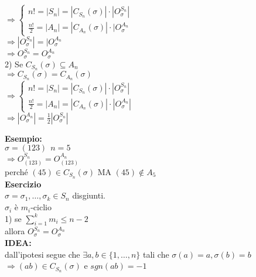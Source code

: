\documentclass[12px]{article}
\begin{document}
{\begin{dimo}
		 $ \Rightarrow \begin{cases}
			 n! = |S_n| = |C_{S_n}(\sigma)|\cdot |O_\sigma^{S_n}|\\
			 \frac{n!}2 = |A_n| = |C_{A_n}(\sigma)|\cdot|O_\sigma^{A_n}
		 \end{cases}$ \\
	 $ \Rightarrow |O_\sigma^{S_n}| = |O_\sigma^{A_n}$\\
	 $ \Rightarrow O_\sigma ^{S_n}= O_\sigma^{A_n}$ \\
	 2) Se $C_{S_n}(\sigma)\subseteq A_n$\\
	 $ \Rightarrow C_{S_n}(\sigma) = C_{A_n}(\sigma)$\\
	 $ \Rightarrow \begin{cases}
		 n! = |S_n| = |C_{S_n}(\sigma)|\cdot|O_\sigma^{S_n}|\\
		 \frac{n!}2 = |A_n| = |C_{A_n}(\sigma)|\cdot|O_\sigma^{A_n}|

	 \end{cases}$ \\
	 $ \Rightarrow |O_\sigma ^{A_n}| = \frac 12 |O_\sigma^{S_n}|$
		
	\end{dimo}
	\textbf{Esempio:}\\
	$\sigma = (123) \ \ n = 5$\\
	$ \Rightarrow O^{S_n}_{(123)} = O^{A_n}_{(123)}$\\
	perché $(45)\in C_{S_n}(\sigma)$ MA $(45)\not\in A_5$\\
	\textbf{Esercizio}\\
	$\sigma = \sigma_1,\ldots, \sigma_k\in S_n$ disgiunti.\\
	$\sigma_i$ è $m_i$-ciclio\\
	1) se $\sum^k_{i=1}m_i\leq n-2$\\
	allora $O_\sigma^{S_n} = O_\sigma^{A_n}$ \\
\textbf{IDEA:}\\
dall'ipotesi segue che $\exists a,b\in\{1,\ldots,n\}$ tali che $\sigma(a) = a, \sigma (b) = b$\\
$ \Rightarrow (ab)\in C_{S_n}(\sigma)$ e $sgn(ab) = -1$
}
\end{document}
